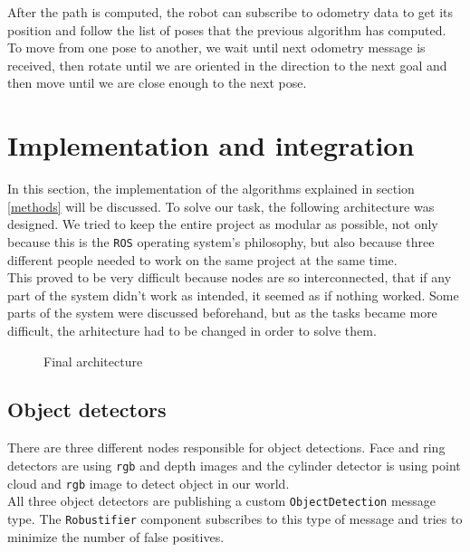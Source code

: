 \documentclass[12pt,a4paper]{article}
\begin{document}
	After the path is computed, the robot can subscribe to odometry data to get its position and follow the list of poses that the previous algorithm has computed. To move from one pose to another, we wait until next odometry message is received, then rotate until we are oriented in the direction to the next goal and then move until we are close enough to the next pose. \\
	
	\section{Implementation and integration}
	In this section, the implementation of the algorithms explained in section \ref{methods} will be discussed. To solve our task, the following architecture was designed. We tried to keep the entire project as modular as possible, not only because this is the \texttt{ROS} operating system's philosophy, but also because three different people needed to work on the same project at the same time. \\ %
	
	This proved to be very difficult because nodes are so interconnected, that if any part of the system didn't work as intended, it seemed as if nothing worked. Some parts of the system were discussed beforehand, but as the tasks became more difficult, the arhitecture had to be changed in order to solve them. \\ 
	
	\begin{figure}[h]
		\centering
		\caption{Final architecture}
		\label{fig:final_architecture}
	\end{figure}
	
	\subsection{Object detectors}
	There are three different nodes responsible for object detections. Face and ring detectors are using \texttt{rgb} and depth images and the cylinder detector is using point cloud and \texttt{rgb} image to detect object in our world. \\
	
	All three object detectors are publishing a custom \texttt{ObjectDetection} message type. The \texttt{Robustifier} component subscribes to this type of message and tries to minimize the number of false positives. 
	
\end{document}
